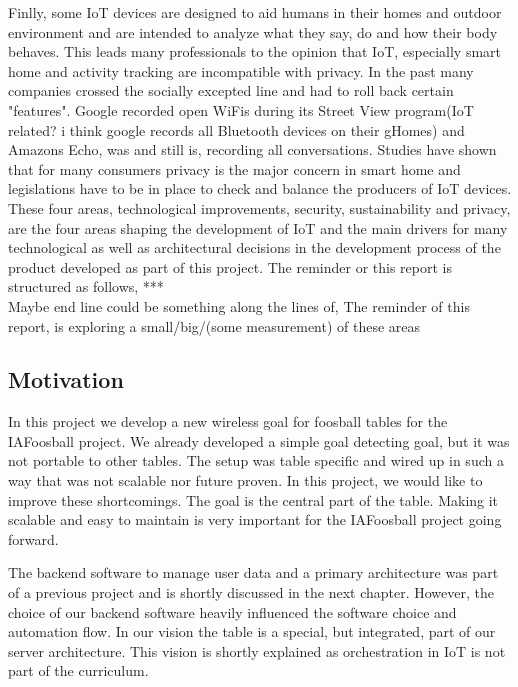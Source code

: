 Finlly, some IoT devices are designed to aid humans in their homes and outdoor environment and are intended to analyze what they say, do and how their body behaves. This leads many professionals to the opinion that IoT, especially smart home and activity tracking are incompatible with privacy\cite{5Reasons41:online}. In the past many companies crossed the socially excepted line and had to roll back certain "features"\cite{PrivacyIoT50:online}. Google recorded open WiFis during its Street View program(IoT related? i think google records all Bluetooth devices on their gHomes) and Amazons Echo, was and still is, recording all conversations. Studies have shown that for many consumers privacy is the major concern in smart home\cite{PrivacyIoT50:online} and legislations have to be in place to check and balance the producers of IoT devices.\\

These four areas, technological improvements, security, sustainability and privacy, are the four areas shaping the development of IoT and the main drivers for many technological as well as architectural decisions in the development process of the product developed as part of this project. The reminder or this report is structured as follows, ***\\
Maybe end line could be something along the lines of, The reminder of this report, is exploring a small/big/(some measurement) of these areas 

\subsection{Motivation}
In this project we develop a new wireless goal for foosball tables for the IAFoosball project. We already developed a simple goal detecting goal, but it was not portable to other tables. The setup was table specific and wired up in such a way that was not scalable nor future proven. In this project, we would like to improve these shortcomings. The goal is the central part of the table. Making  it scalable and easy to maintain is very important for the IAFoosball project going forward. 

The backend software to manage user data and a primary architecture was part of a previous project and is shortly discussed in the next chapter. However, the choice of our backend software heavily influenced the software choice and automation flow. 
In our vision the table is a special, but integrated, part of our server architecture. This vision is shortly explained as orchestration in IoT is not part of the curriculum.\\

